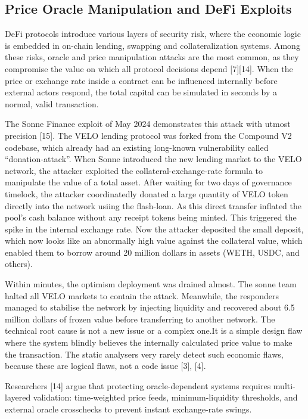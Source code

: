 \documentclass[conference]{IEEEtran}
\begin{document}
\subsection{Price Oracle Manipulation and DeFi Exploits}
DeFi protocols introduce various layers of security risk, where the economic logic is embedded in on-chain lending, swapping and collateralization systems. Among these risks, oracle and price manipulation attacks are the most common, as they compromise the value on which all protocol decisions depend [7][14]. When the price or exchange rate inside a contract can be influenced internally before external actors respond, the total capital can be simulated in seconds by a normal, valid transaction.

The Sonne Finance exploit of May 2024 demonstrates this attack with utmost precision [15]. The VELO lending protocol was forked from the Compound V2 codebase, which already had an existing long-known vulnerability called “donation-attack”. When Sonne introduced the new lending market to the VELO network, the attacker exploited the collateral-exchange-rate formula to manipulate the value of a total asset. After waiting for two days of governance timelock, the attacker coordinatedly donated a large quantity of VELO token directly into the network usiing the flash-loan. As this direct transfer inflated the pool’s cash balance without any receipt tokens being minted. This triggered the spike in the internal exchange rate. Now the attacker deposited the small deposit, which now looks like an abnormally high value against the collateral value, which enabled them to borrow around 20 million dollars in assets (WETH, USDC, and others). 

Within minutes, the optimism deployment was drained almost. The sonne team halted all VELO markets to contain the attack. Meanwhile, the responders managed to stabilise the network by injecting liquidity and recovered about 6.5 million dollars of frozen value before transferring to another network. The technical root cause is not a new issue or a complex one.It is a simple design flaw where the system blindly believes the internally calculated price value to make the transaction. The static analysers very rarely detect such economic flaws, because these are logical flaws, not a code issue [3], [4].

Researchers [14] argue that protecting oracle-dependent systems requires multi-layered validation: time-weighted price feeds, minimum-liquidity thresholds, and external oracle crosschecks to prevent instant exchange-rate swings.
\end{document}
